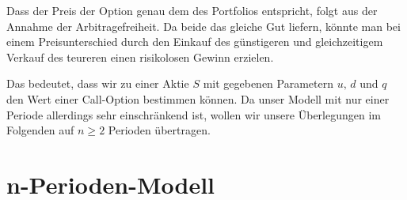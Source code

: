 Dass der Preis der Option genau dem des Portfolios entspricht, folgt aus der Annahme der Arbitragefreiheit. Da beide das gleiche Gut liefern, könnte man bei einem Preisunterschied durch den Einkauf des günstigeren und gleichzeitigem Verkauf des teureren einen risikolosen Gewinn erzielen.

Das bedeutet, dass wir zu einer Aktie $S$ mit gegebenen Parametern $u, \, d \text{ und } q$ den Wert einer Call-Option bestimmen können. Da unser Modell mit nur einer Periode allerdings sehr einschränkend ist, wollen wir unsere Überlegungen im Folgenden auf $n \geq 2$ Perioden übertragen.

\section{n-Perioden-Modell}                 %

